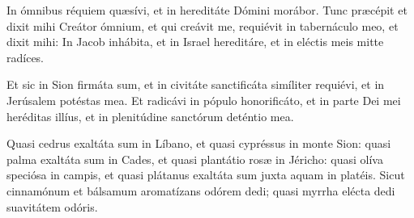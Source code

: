 
In ómnibus réquiem quæsívi, et in hereditáte Dómini morábor.
Tunc præcépit et dixit mihi Creátor ómnium, 
et qui creávit me, requiévit in tabernáculo meo,
et dixit mihi: 
In Jacob inhábita, et in Israel hereditáre,
et in eléctis meis mitte radíces.

\tuAutem


\vfill \pagebreak






Et sic in Sion firmáta sum, et in civitáte sanctificáta simíliter requiévi,
et in Jerúsalem potéstas mea.
Et radicávi in pópulo honorificáto, et in parte Dei mei heréditas illíus,
et in plenitúdine sanctórum deténtio mea.

\tuAutem



\vfill \pagebreak






Quasi cedrus exaltáta sum in Líbano, et quasi cypréssus in monte Sion:
quasi palma exaltáta sum in Cades, et quasi plantátio rosæ in Jéricho:
quasi olíva speciósa in campis, et quasi plátanus exaltáta sum juxta aquam
in platéis.
Sicut cinnamónum et bálsamum aromatízans odórem dedi; 
quasi myrrha elécta dedi suavitátem odóris.

\tuAutem

